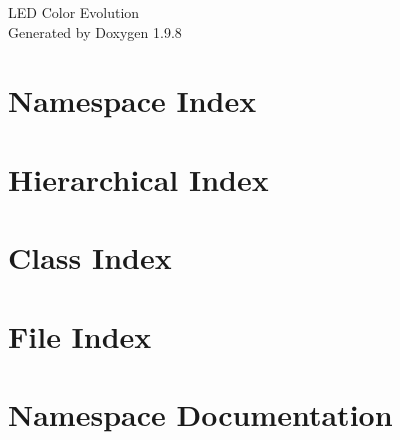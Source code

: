 \documentclass[twoside]{book}
\newcommand{\+}{\discretionary{\mbox{\scriptsize$\hookleftarrow$}}{}{}}
\newcommand{\clearemptydoublepage}{%
    \newpage{\pagestyle{empty}\cleardoublepage}%
  }
\begin{document}
  \raggedbottom
    \hypersetup{pageanchor=false,
                bookmarksnumbered=true,
                pdfencoding=unicode
               }
  \begin{titlepage}
  \vspace*{7cm}
  \begin{center}%
  {\Large LED Color Evolution}\\
  \vspace*{1cm}
  {\large Generated by Doxygen 1.9.8}\\
  \end{center}
  \end{titlepage}
  \clearemptydoublepage
  \tableofcontents
  \clearemptydoublepage
  \hypersetup{pageanchor=true}













\chapter{Namespace Index}

\chapter{Hierarchical Index}

\chapter{Class Index}

\chapter{File Index}

\chapter{Namespace Documentation}




















\end{document}

